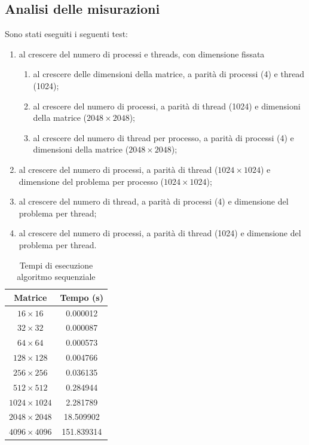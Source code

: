 \subsection{Analisi delle misurazioni}
Sono stati eseguiti i seguenti test:
\begin{enumerate}
    \item al crescere del numero di processi e threads, con dimensione fissata
          \begin{enumerate}
              \item al crescere delle dimensioni della matrice, a parità di processi (4) e thread (1024);
              \item al crescere del numero di processi, a parità di thread (1024) e dimensioni della matrice ($2048 \times 2048$);
              \item al crescere del numero di thread per processo, a parità di processi (4) e dimensioni della matrice ($2048 \times 2048$);
          \end{enumerate}
    \item al crescere del numero di processi, a parità di thread ($1024 \times 1024$) e dimensione del problema per processo ($1024 \times 1024$);
    \item al crescere del numero di thread, a parità di processi (4) e dimensione del problema per thread;
    \item al crescere del numero di processi, a parità di thread (1024) e dimensione del problema per thread.
\end{enumerate}

\begin{table}[H]
    \centering
    \begin{tabular}{cc}
        \hline
        \textbf{Matrice}    & \textbf{Tempo (s)} \\ \hline
        $16   \times 16   $ & 0.000012           \\
        $32   \times 32   $ & 0.000087           \\
        $64   \times 64   $ & 0.000573           \\
        $128  \times 128  $ & 0.004766           \\
        $256  \times 256  $ & 0.036135           \\
        $512  \times 512  $ & 0.284944           \\
        $1024 \times 1024 $ & 2.281789           \\
        $2048 \times 2048 $ & 18.509902          \\
        $4096 \times 4096 $ & 151.839314         \\ \hline
    \end{tabular}
    \caption{Tempi di esecuzione algoritmo sequenziale}
\end{table}

